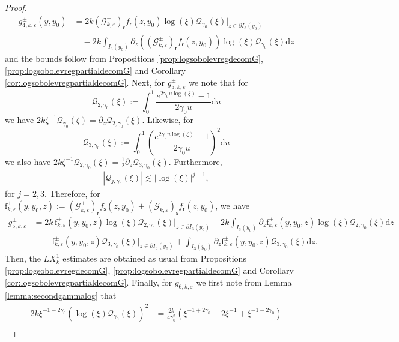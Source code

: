 \documentclass[11pt,reqno]{amsproc}
\theoremstyle{definition}
\numberwithin{equation}{section}
\newcommand{\G}{{\mathcal{G}}}
\newcommand{\Q}{{\mathcal{Q}}}
\newcommand{\sr}{{\mathsf{r}}}
\newcommand{\s}{{\mathsf{s}}}
\renewcommand{\d}{\mathrm{d}}
\newcommand{\ep}{\varepsilon}
\begin{document}
\begin{proof}
\begin{align*}
g_{4,k,\ep}^\pm(y,y_0) &= 2k \left( \G_{k,\ep}^\pm \right)_\sr f_\sr(z,y_0) \log(\xi) \Q_{\gamma_0}(\xi) \Big|_{z\in \partial I_3(y_0)} \\
&\quad - 2k\int_{I_3(y_0)} \partial_z \left( \left( \G_{k,\ep}^\pm \right)_\sr f_\sr(z,y_0)\right) \log(\xi) \Q_{\gamma_0}(\xi) \d z
\end{align*}
and the bounds follow from Propositions \ref{prop:logsobolevregdecomG}, \ref{prop:logsobolevregpartialdecomG} and Corollary \ref{cor:logsobolevregpartialdecomG}. Next, for $g_{5,k,\ep}^\pm$ we note that for
\begin{equation}\label{eq:defQ2gamma}
\Q_{2,\gamma_0}(\xi) := \int_0^1 \frac{e^{2\gamma_0 u \log(\xi)} - 1}{2\gamma_0 u} \d u  
\end{equation}
we have $2k\zeta^{-1}\Q_{\gamma_0}(\zeta) = \partial_z\Q_{2,\gamma_0}(\xi)$. Likewise, for 
\begin{equation}\label{eq:defQ3gamma}
\Q_{3,\gamma_0}(\xi) := \int_0^1 \left(\frac{e^{2\gamma_0 u \log(\xi)} - 1}{2\gamma_0 u}\right)^2 \d u  
\end{equation}
we also have $2k\zeta^{-1}\Q_{2,\gamma_0}(\xi)   = \frac12\partial_z \Q_{3,\gamma_0}(\xi)$. Furthermore,  
\begin{align*}
\left| \Q_{j,\gamma_0}(\xi)  \right| \lesssim |\log(\xi)|^{j-1},
\end{align*}
for $j=2,3$. Therefore, for $\mathrm{f}_{k,\ep}^\pm(y,y_0,z) := \left( \G_{k,\ep}^\pm \right)_\sr f_\s(z,y_0) + \left( \G_{k,\ep}^\pm \right)_\s f_\sr(z,y_0)$, we have
\begin{align*}
g_{5,k,\ep}^\pm &= 2k \,\mathrm{f}_{k,\ep}^\pm(y,y_0,z) \log(\xi) \Q_{2,\gamma_0}(\xi) \Big|_{z\in \partial I_3(y_0)} - 2k\int_{I_3(y_0)} \partial_z \mathrm{f}_{k,\ep}^\pm(y,y_0,z) \log(\xi) \Q_{2,\gamma_0}(\xi)\d z \\
&\quad - \mathrm{f}_{k,\ep}^\pm(y,y_0,z) \Q_{3,\gamma_0}(\xi) \Big|_{z\in \partial I_3(y_0)}  + \int_{I_3(y_0)} \partial_z \mathrm{f}_{k,\ep}^\pm(y,y_0,z) \Q_{3,\gamma_0}(\xi)\d z.
\end{align*}
Then, the $LX_k^1$ estimates are obtained as usual from Propositions \ref{prop:logsobolevregdecomG}, \ref{prop:logsobolevregpartialdecomG} and Corollary \ref{cor:logsobolevregpartialdecomG}. Finally, for $g_{6,k,\ep}^\pm$ we first note from Lemma \ref{lemma:secondgammalog} that
\begin{align*}
2k\xi^{-1-2\gamma_0}\left( \log(\xi) \Q_{\gamma_0}(\xi) \right)^2 &= \frac{2k}{4\gamma_0^2} \left( \xi^{-1+2\gamma_0} -2\xi^{-1} + \xi^{-1-2\gamma_0} \right) \\

\end{align*}
\end{proof}
\end{document}
